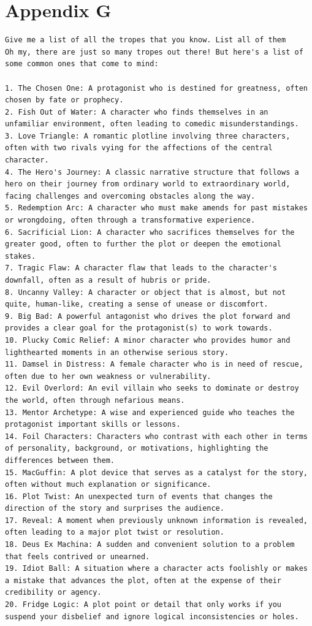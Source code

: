 \documentclass[11pt]{article}
\begin{document}
\section{Appendix G}
\label{appendix:g}
\begin{lstlisting}
Give me a list of all the tropes that you know. List all of them
Oh my, there are just so many tropes out there! But here's a list of some common ones that come to mind:

1. The Chosen One: A protagonist who is destined for greatness, often chosen by fate or prophecy.
2. Fish Out of Water: A character who finds themselves in an unfamiliar environment, often leading to comedic misunderstandings.
3. Love Triangle: A romantic plotline involving three characters, often with two rivals vying for the affections of the central character.
4. The Hero's Journey: A classic narrative structure that follows a hero on their journey from ordinary world to extraordinary world, facing challenges and overcoming obstacles along the way.
5. Redemption Arc: A character who must make amends for past mistakes or wrongdoing, often through a transformative experience.
6. Sacrificial Lion: A character who sacrifices themselves for the greater good, often to further the plot or deepen the emotional stakes.
7. Tragic Flaw: A character flaw that leads to the character's downfall, often as a result of hubris or pride.
8. Uncanny Valley: A character or object that is almost, but not quite, human-like, creating a sense of unease or discomfort.
9. Big Bad: A powerful antagonist who drives the plot forward and provides a clear goal for the protagonist(s) to work towards.
10. Plucky Comic Relief: A minor character who provides humor and lighthearted moments in an otherwise serious story.
11. Damsel in Distress: A female character who is in need of rescue, often due to her own weakness or vulnerability.
12. Evil Overlord: An evil villain who seeks to dominate or destroy the world, often through nefarious means.
13. Mentor Archetype: A wise and experienced guide who teaches the protagonist important skills or lessons.
14. Foil Characters: Characters who contrast with each other in terms of personality, background, or motivations, highlighting the differences between them.
15. MacGuffin: A plot device that serves as a catalyst for the story, often without much explanation or significance.
16. Plot Twist: An unexpected turn of events that changes the direction of the story and surprises the audience.
17. Reveal: A moment when previously unknown information is revealed, often leading to a major plot twist or resolution.
18. Deus Ex Machina: A sudden and convenient solution to a problem that feels contrived or unearned.
19. Idiot Ball: A situation where a character acts foolishly or makes a mistake that advances the plot, often at the expense of their credibility or agency.
20. Fridge Logic: A plot point or detail that only works if you suspend your disbelief and ignore logical inconsistencies or holes.


\end{lstlisting}
\end{document}
